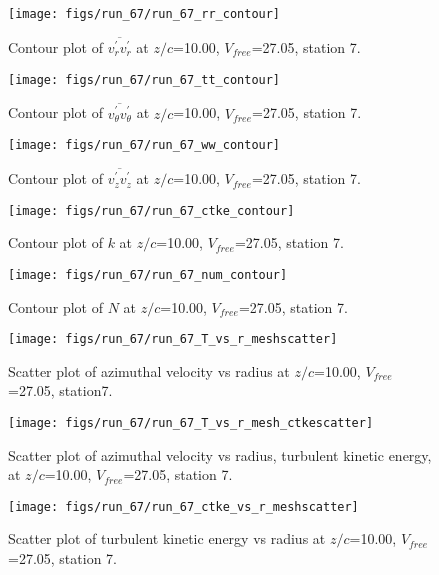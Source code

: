 \begin{figure}[H]
\centering
\texttt{[image: figs/run\_67/run\_67\_rr\_contour]}
\caption{Contour plot of $\overline{v_{r}^{\prime} v_{r}^{\prime}}$ at $z/c$=10.00, $V_{free}$=27.05, station 7.}
\end{figure}


\begin{figure}[H]
\centering
\texttt{[image: figs/run\_67/run\_67\_tt\_contour]}
\caption{Contour plot of $\overline{v_{\theta}^{\prime} v_{\theta}^{\prime}}$ at $z/c$=10.00, $V_{free}$=27.05, station 7.}
\end{figure}


\begin{figure}[H]
\centering
\texttt{[image: figs/run\_67/run\_67\_ww\_contour]}
\caption{Contour plot of $\overline{v_{z}^{\prime} v_{z}^{\prime}}$ at $z/c$=10.00, $V_{free}$=27.05, station 7.}
\end{figure}


\begin{figure}[H]
\centering
\texttt{[image: figs/run\_67/run\_67\_ctke\_contour]}
\caption{Contour plot of $k$ at $z/c$=10.00, $V_{free}$=27.05, station 7.}
\end{figure}


\begin{figure}[H]
\centering
\texttt{[image: figs/run\_67/run\_67\_num\_contour]}
\caption{Contour plot of $N$ at $z/c$=10.00, $V_{free}$=27.05, station 7.}
\end{figure}


\begin{figure}[H]
\centering
\texttt{[image: figs/run\_67/run\_67\_T\_vs\_r\_meshscatter]}
\caption{Scatter plot of azimuthal velocity vs radius at $z/c$=10.00, $V_{free}$=27.05, station7.}
\end{figure}


\begin{figure}[H]
\centering
\texttt{[image: figs/run\_67/run\_67\_T\_vs\_r\_mesh\_ctkescatter]}
\caption{Scatter plot of azimuthal velocity vs radius, turbulent kinetic energy, at $z/c$=10.00, $V_{free}$=27.05, station 7.}
\end{figure}


\begin{figure}[H]
\centering
\texttt{[image: figs/run\_67/run\_67\_ctke\_vs\_r\_meshscatter]}
\caption{Scatter plot of turbulent kinetic energy vs radius at $z/c$=10.00, $V_{free}$=27.05, station 7.}
\end{figure}


